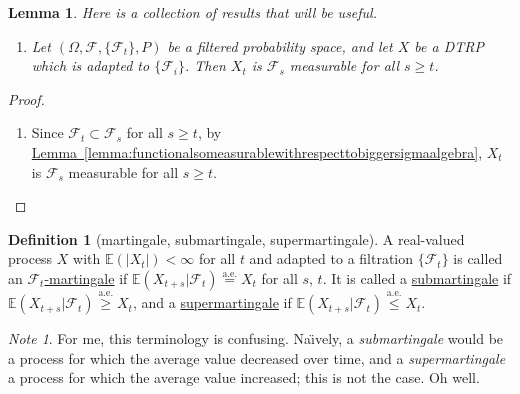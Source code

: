 \documentclass[a4paper,12pt]{scrreprt}
\newcommand{\defn}[1]{\ul{#1}}
\theoremstyle{definition}
\newtheorem{definition}{Definition}[section]
\theoremstyle{plain}
\newtheorem{lemma}{Lemma}[section]
\theoremstyle{remark}
\newtheorem{note}{Note}[section]
\begin{document}
\begin{lemma}
  Here is a collection of results that will be useful.
  \begin{enumerate}
    \item Let $(\Omega, \mathcal{F}, \{ \mathcal{F}_{t} \}, P)$ be a filtered probability space, and let $X$ be a DTRP which is adapted to $\{ \mathcal{F}_{i} \}$. Then $X_{t}$ is $\mathcal{F}_{s}$ measurable for all $s \geq t$.
  \end{enumerate}
\end{lemma}
\begin{proof}
  $\,$
  \begin{enumerate}
    \item Since $\mathcal{F}_{t} \subset \mathcal{F}_{s}$ for all $s \geq t$, by \hyperref[lemma:functionalsomeasurablewithrespecttobiggersigmaalgebra]{Lemma~\ref*{lemma:functionalsomeasurablewithrespecttobiggersigmaalgebra}}, $X_{t}$ is $\mathcal{F}_{s}$ measurable for all $s \geq t$.
  \end{enumerate}
\end{proof}

\begin{definition}[martingale, submartingale, supermartingale]
  \label{def:subsupermartingale}
  A real-valued process $X$ with $\mathbb{E}(|X_{t}|) < \infty$ for all $t$ and adapted to a filtration $\{\mathcal{F}_{t}\}$ is called an \defn{$\mathcal{F}_{t}$-martingale} if $\mathbb{E}(X_{t+s}|\mathcal{F}_{t}) \overset{\mathrm{a.e.}}{=} X_{t}$ for all $s$, $t$. It is called a \defn{submartingale} if $\mathbb{E}(X_{t+s}|\mathcal{F}_{t}) \overset{\mathrm{a.e.}}{\geq} X_{t}$, and a \defn{supermartingale} if $\mathbb{E}(X_{t+s}|\mathcal{F}_{t}) \overset{\mathrm{a.e.}}{\leq} X_{t}$.
\end{definition}

\begin{note}
  For me, this terminology is confusing. Na\"{\i}vely, a \emph{submartingale} would be a process for which the average value decreased over time, and a \emph{supermartingale} a process for which the average value increased; this is not the case. Oh well.
\end{note}
\end{document}

